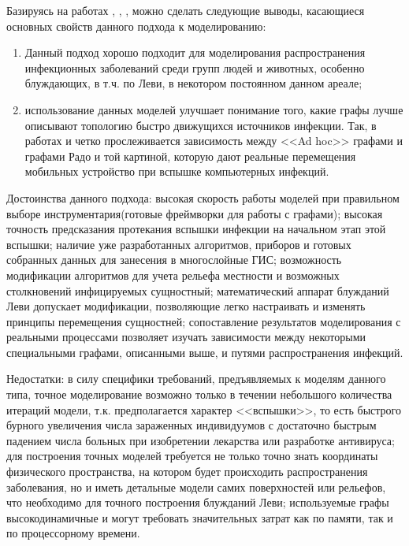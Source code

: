 Базируясь на работах %
\cite{Rhee:2007},
\cite{Privalov:2015} ,
\cite{Klimentiev:2012},
\cite{Klimentiev:2016} можно сделать следующие выводы, касающиеся основных свойств данного подхода к моделированию: 
\begin{enumerate}
	\item Данный подход хорошо подходит для моделирования распространения инфекционных заболеваний среди групп людей и животных, особенно блуждающих, в т.ч. по Леви, в некотором постоянном данном ареале;
	\item использование данных моделей улучшает понимание того, какие графы лучше описывают топологию быстро движущихся источников инфекции. Так, в работах %
	\cite{Klimentiev:2012} и %
	\cite{Klimentiev:2015} четко прослеживается зависимость между <<Ad hoc>> графами и графами Радо и той картиной, которую дают реальные перемещения мобильных устройство при вспышке компьютерных инфекций.
\end{enumerate}


Достоинства данного подхода: высокая скорость работы моделей при правильном выборе инструментария(готовые фреймворки для работы с графами); высокая точность предсказания протекания вспышки инфекции на начальном этап этой вспышки; наличие уже разработанных алгоритмов, приборов и готовых собранных данных для занесения в многослойные ГИС; возможность модификации алгоритмов для учета рельефа местности и возможных столкновений инфицируемых  сущностный; математический аппарат блужданий Леви допускает модификации, позволяющие легко настраивать и изменять принципы перемещения сущностней; сопоставление результатов моделирования с реальными процессами позволяет изучать зависимости между некоторыми специальными графами, описанными выше, и путями распространения инфекций. 


Недостатки: в силу специфики требований, предъявляемых к моделям данного типа, точное моделирование возможно только в течении небольшого количества итераций модели, т.к. предполагается характер <<вспышки>>, то есть быстрого бурного увеличения числа зараженных индивидуумов с достаточно быстрым падением числа больных при изобретении лекарства или разработке антивируса; для построения точных моделей требуется не только точно знать координаты физического пространства, на котором будет происходить распространения заболевания, но и иметь детальные модели самих поверхностей или рельефов, что необходимо для точного построения блужданий Леви; используемые графы высокодинамичные и могут требовать значительных затрат как по памяти, так и по процессорному времени.

